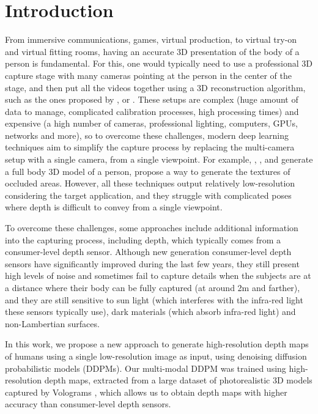 \section{Introduction}\label{sec:introduction}

From immersive communications, games, virtual production, to virtual try-on and virtual fitting rooms, having an accurate 3D presentation of the body of a person is fundamental. For this, one would typically need to use a professional 3D capture stage with many cameras pointing at the person in the center of the stage, and then put all the videos together using a 3D reconstruction algorithm, such as the ones proposed by \cite{guo2019relightables}, \cite{collet2015high} or \cite{pages2018affordable}. These setups are complex (huge amount of data to manage, complicated calibration processes, high processing times) and expensive (a high number of cameras, professional lighting, computers, GPUs, networks and more), so to overcome these challenges, modern deep learning techniques aim to simplify the capture process by replacing the multi-camera setup with a single camera, from a single viewpoint. For example, \cite{saito2019pifu}, \cite{saito2020pifuhd}, and \cite{xiu2022icon} generate a full body 3D model of a person, \cite{escribano2022texture} propose a way to generate the textures of occluded areas. However, all these techniques output relatively low-resolution considering the target application, and they struggle with complicated poses where depth is difficult to convey from a single viewpoint.

To overcome these challenges, some approaches include additional information into the capturing process, including depth, which typically comes from a consumer-level depth sensor. Although new generation consumer-level depth sensors have significantly improved during the last few years, they still present high levels of noise and sometimes fail to capture details when the subjects are at a distance where their body can be fully captured (at around 2m and farther), and they are still sensitive to sun light (which interferes with the infra-red light these sensors typically use), dark materials (which absorb infra-red light) and non-Lambertian surfaces. 

In this work, we propose a new approach to generate high-resolution depth maps of humans using a single low-resolution image as input, using denoising diffusion probabilistic models (DDPMs). Our multi-modal DDPM was trained using high-resolution depth maps, extracted from a large dataset of photorealistic 3D models captured by Volograms \citep{volograms2021}, which allows us to obtain depth maps with higher accuracy than consumer-level depth sensors.

